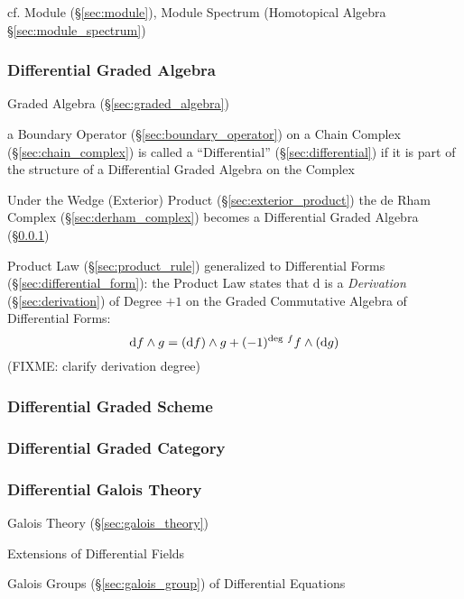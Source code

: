 cf. Module (\S\ref{sec:module}), Module Spectrum (Homotopical Algebra
\S\ref{sec:module_spectrum})



\subsubsection{Differential Graded Algebra}
\label{sec:differential_graded_algebra}

Graded Algebra (\S\ref{sec:graded_algebra})

a Boundary Operator (\S\ref{sec:boundary_operator}) on a Chain Complex
(\S\ref{sec:chain_complex}) is called a ``Differential''
(\S\ref{sec:differential}) if it is part of the structure of a Differential
Graded Algebra on the Complex

Under the Wedge (Exterior) Product (\S\ref{sec:exterior_product}) the de Rham
Complex (\S\ref{sec:derham_complex}) becomes a Differential Graded Algebra
(\S\ref{sec:differential_graded_algebra})

Product Law (\S\ref{sec:product_rule}) generalized to Differential Forms
(\S\ref{sec:differential_form}): the Product Law states that $\mathrm{d}$ is a
\emph{Derivation} (\S\ref{sec:derivation}) of Degree $+1$ on the Graded
Commutative Algebra of Differential Forms:
\[
\mathrm{d}f \wedge g = (\mathrm{d}f) \wedge g +
  (-1)^{\mathrm{deg}\ f}f \wedge (\mathrm{d}g)
\]
(FIXME: clarify derivation degree)



\subsubsection{Differential Graded Scheme}\label{sec:differential_graded_scheme}

\subsubsection{Differential Graded Category}
\label{sec:differential_graded_category}

\subsubsection{Differential Galois Theory}\label{sec:differential_galois}

Galois Theory (\S\ref{sec:galois_theory})

Extensions of Differential Fields

Galois Groups (\S\ref{sec:galois_group}) of Differential Equations



